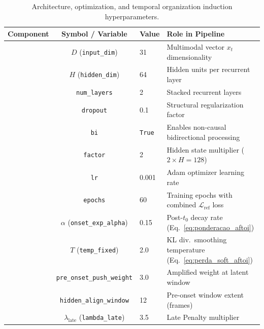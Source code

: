 \documentclass[a4paper,fleqn]{cas-dc}
\begin{document}
\begin{table}[!tbp]
\centering
\caption{Architecture, optimization, and temporal organization induction hyperparameters.}
\label{tab:hiperparametros_treinamento}
\footnotesize
\setlength{\tabcolsep}{6pt}
\renewcommand{\arraystretch}{1.18}
\begin{tabularx}{\textwidth}{l c l X}
\toprule
\textbf{Component} & \textbf{Symbol / Variable} & \textbf{Value} & \textbf{Role in Pipeline} \\
\midrule
{}
 & $D$ (\texttt{input\_dim})   & 31   & Multimodal vector $x_t$ dimensionality \\
 & $H$ (\texttt{hidden\_dim})  & 64   & Hidden units per recurrent layer \\
 & \texttt{num\_layers}         & 2    & Stacked recurrent layers \\
 & \texttt{dropout}            & 0.1  & Structural regularization factor \\
\midrule
{}
 & \texttt{bi}                 & \texttt{True} & Enables non-causal bidirectional processing \\
 & \texttt{factor}             & 2     & Hidden state multiplier ($2 \times H = 128$) \\
 & \texttt{lr}                 & 0.001 & Adam optimizer learning rate \\
 & \texttt{epochs}             & 60    & Training epochs with combined $\mathcal{L}_{\text{ref}}$ loss \\
\midrule
{}
 & $\alpha$ (\texttt{onset\_exp\_alpha}) & 0.15 & Post-$t_0$ decay rate (Eq.~\ref{eq:ponderacao_aftoi}) \\
 & $T$ (\texttt{temp\_fixed})            & 2.0  & KL div.\ smoothing temperature (Eq.~\ref{eq:perda_soft_aftoi}) \\
 & \texttt{pre\_onset\_push\_weight}    & 3.0  & Amplified weight at latent window \\
 & \texttt{hidden\_align\_window}           & 12   & Pre-onset window extent (frames) \\
 & $\lambda_{\text{late}}$ (\texttt{lambda\_late}) & 3.5 & Late Penalty multiplier \\

\end{tabularx}
\end{table}
\end{document}
